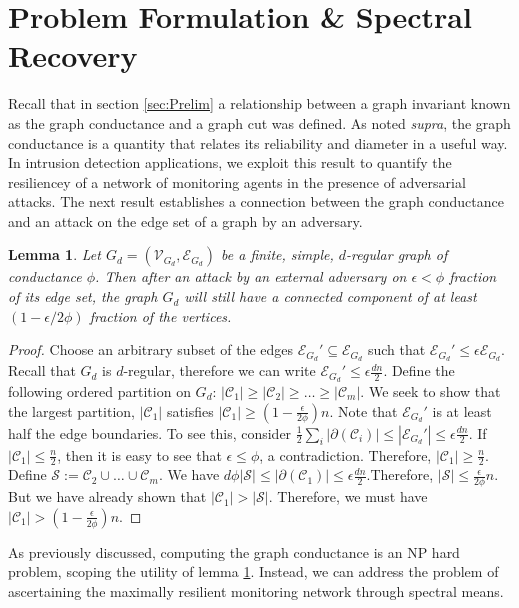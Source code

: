 \documentclass[reqno,8pt]{amsart}
\newtheorem{lemma}{Lemma}
\theoremstyle{definition}
\theoremstyle{remark}
\numberwithin{equation}{section}
\def\cC{\mathcal{C}}
\def\cS{\mathcal{S}}
\def\cVGD{\mathcal{V}_{G_d}}
\def\cEGD{\mathcal{E}_{G_d}}
\def\GD{G_d=(\cVGD,\cEGD)}
\begin{document}
\section{Problem Formulation \& Spectral Recovery} \label{sec:problemFormulationSpecRecovery}
Recall that in section \ref{sec:Prelim} a relationship between a graph invariant known as the graph conductance and a graph cut was defined. As noted \textit{supra}, the graph conductance is a quantity that relates its reliability and diameter in a useful way. In intrusion detection applications, we exploit this result to quantify the resiliencey of a network of monitoring agents in the presence of adversarial attacks. The next result establishes a connection between the graph conductance and an attack on the edge set of a graph by an adversary.
\begin{lemma} \label{lem:adversaryConComp}
Let $\GD$ be a finite, simple, $d$-regular graph of conductance $\phi$. Then after an attack by an external adversary on $\epsilon < \phi$ fraction of its edge set, the graph $G_d$ will still have a connected component of at least $(1-\epsilon/2\phi)$ fraction of the vertices. 
\end{lemma}
\begin{proof}
Choose an arbitrary subset of the edges $\cEGD' \subseteq \cEGD$ such that $\cEGD' \leq \epsilon \cEGD$. Recall that $G_d$ is $d$-regular, therefore we can write $\cEGD' \leq \epsilon\frac{dn}{2}$. Define the following ordered partition on $G_d$: $|\cC_1| \geq |\cC_2| \geq \ldots \geq |\cC_m|$. We seek to show that the largest partition, $|\cC_1|$ satisfies $|\cC_1| \geq (1-\frac{\epsilon}{2\phi})n$. Note that $\cEGD'$ is at least half the edge boundaries. To see this, consider $\frac{1}{2} \sum_i |\partial(\cC_i)| \leq |\cEGD'| \leq \epsilon\frac{dn}{2}$. If $|\cC_1| \leq \frac{n}{2}$, then it is easy to see that $\epsilon \leq \phi$, a contradiction. Therefore, $|\cC_1| \geq \frac{n}{2}$. Define $\cS := \cC_2 \cup \ldots \cup \cC_m$. We have $d\phi |\cS| \leq |\partial(\cC_1)| \leq \epsilon\frac{dn}{2}$.Therefore, $|\cS| \leq \frac{\epsilon}{2\phi}n$. But we have already shown that $|\cC_1| > |\cS|$.  Therefore, we must have $|\cC_1| >\left(1- \frac{\epsilon}{2\phi} \right)n$.
\end{proof}
As previously discussed, computing the graph conductance is an NP hard problem, scoping the utility of lemma \ref{lem:adversaryConComp}. Instead, we can address the problem of ascertaining the maximally resilient monitoring network through spectral means. 
\end{document}
